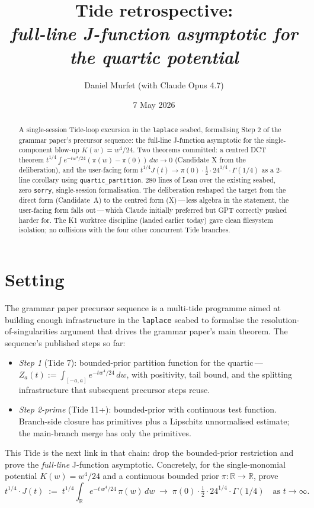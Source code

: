\documentclass[11pt]{article}
\title{Tide retrospective:\\\emph{full-line J-function asymptotic for the quartic potential}}
\author{Daniel Murfet (with Claude Opus 4.7)}
\date{7 May 2026}
\begin{document}
\sloppy
\maketitle

\begin{abstract}
A single-session Tide-loop excursion in the \texttt{laplace} seabed,
formalising Step 2 of the grammar paper's precursor sequence: the
full-line J-function asymptotic for the single-component blow-up
$K(w) = w^4/24$. Two theorems committed: a centred DCT theorem
$t^{1/4} \int e^{-t w^4/24}(\pi(w) - \pi(0))\,dw \to 0$ (Candidate X
from the deliberation), and the user-facing form $t^{1/4} J(t) \to
\pi(0) \cdot \tfrac12 \cdot 24^{1/4} \cdot \Gamma(1/4)$ as a 2-line
corollary using \texttt{quartic\_partition}. 280 lines of Lean over
the existing seabed, zero \texttt{sorry}, single-session
formalisation. The deliberation reshaped the target from the direct
form (Candidate~A) to the centred form (X)\,---\,less algebra in the
statement, the user-facing form falls out\,---\,which Claude initially
preferred but GPT correctly pushed harder for. The K1 worktree
discipline (landed earlier today) gave clean filesystem isolation;
no collisions with the four other concurrent Tide branches.
\end{abstract}

\section{Setting}

The grammar paper precursor sequence is a multi-tide programme aimed
at building enough infrastructure in the \texttt{laplace} seabed to
formalise the resolution-of-singularities argument that drives the
grammar paper's main theorem. The sequence's published steps so far:

\begin{itemize}[leftmargin=*]
\item \emph{Step 1} (Tide 7): bounded-prior partition function for
the quartic\,---\,$Z_a(t) := \int_{[-a,a]} e^{-tw^4/24}\,dw$, with
positivity, tail bound, and the splitting infrastructure that
subsequent precursor steps reuse.
\item \emph{Step 2-prime} (Tide 11+): bounded-prior with continuous
test function. Branch-side closure has primitives plus a Lipschitz
unnormalised estimate; the main-branch merge has only the primitives.
\end{itemize}

This Tide is the next link in that chain: drop the bounded-prior
restriction and prove the \emph{full-line} J-function asymptotic.
Concretely, for the single-monomial potential $K(w) = w^4/24$ and a
continuous bounded prior $\pi : \mathbb{R} \to \mathbb{R}$, prove
\[
  t^{1/4} \cdot J(t) \;:=\; t^{1/4} \int_\mathbb{R} e^{-t\,w^4/24}\,\pi(w)\,dw
  \;\longrightarrow\; \pi(0) \cdot \tfrac12 \cdot 24^{1/4} \cdot \Gamma(1/4)
  \quad\text{as } t \to \infty.
\]
\end{document}
